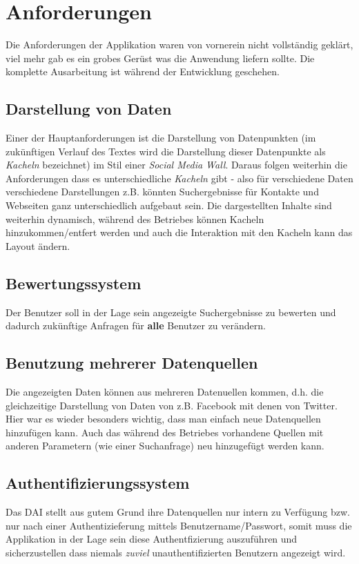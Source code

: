 \documentclass[12pt,twoside]{book}
\begin{document}
\section*{Anforderungen}

Die Anforderungen der Applikation waren von vornerein nicht vollständig geklärt, viel mehr gab es ein grobes Gerüst was die Anwendung liefern sollte. Die komplette Ausarbeitung ist während der Entwicklung geschehen.

\subsection*{Darstellung von Daten}

  Einer der Hauptanforderungen ist die Darstellung von Datenpunkten (im zukünftigen Verlauf des Textes wird die Darstellung dieser Datenpunkte als \textit{Kacheln} bezeichnet) im Stil einer \textit{Social Media Wall}. Daraus folgen weiterhin die Anforderungen dass es unterschiedliche \textit{Kacheln} gibt - also für verschiedene Daten verschiedene Darstellungen z.B. könnten Suchergebnisse für Kontakte und Webseiten ganz unterschiedlich aufgebaut sein. Die dargestellten Inhalte sind weiterhin dynamisch, während des Betriebes können Kacheln hinzukommen/entfert werden und auch die Interaktion mit den Kacheln kann das Layout ändern.

\subsection*{Bewertungssystem}

  Der Benutzer soll in der Lage sein angezeigte Suchergebnisse zu bewerten und dadurch zukünftige Anfragen für \textbf{alle} Benutzer zu verändern.

\subsection*{Benutzung mehrerer Datenquellen}
  Die angezeigten Daten können aus mehreren Datenuellen kommen, d.h. die gleichzeitige Darstellung von Daten von z.B. Facebook mit denen von Twitter. Hier war es wieder besonders wichtig, dass man einfach neue Datenquellen hinzufügen kann. Auch das während des Betriebes vorhandene Quellen mit anderen Parametern (wie einer Suchanfrage) neu hinzugefügt werden kann.

\subsection*{Authentifizierungssystem}
  Das DAI stellt aus gutem Grund ihre Datenquellen nur intern zu Verfügung bzw. nur nach einer Authentizieferung mittels Benutzername/Passwort, somit muss die Applikation in der Lage sein diese Authentfizierung auszuführen und sicherzustellen dass niemals \textit{zuviel} unauthentifizierten Benutzern angezeigt wird.
\end{document}
